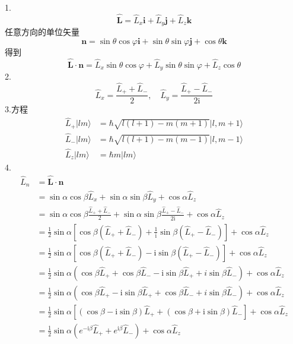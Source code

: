 1.
\begin{equation}
    \hat{\boldsymbol{L}}=\hat{L}_x\boldsymbol{i}+\hat{L}_y\boldsymbol{j}+\hat{L}_z\boldsymbol{k}
\end{equation}
任意方向的单位矢量
\begin{equation}
    \boldsymbol{n}=\sin \theta \cos \varphi \boldsymbol{i}+\sin \theta \sin \varphi \boldsymbol{j}+\cos \theta \boldsymbol{k}
\end{equation}
得到
\begin{equation}
    \hat{\boldsymbol{L}}\cdot \boldsymbol{n}=\hat{L}_x\sin \theta \cos \varphi +\hat{L}_y\sin \theta \sin \varphi +\hat{L}_z\cos \theta 
\end{equation}
2.
\begin{equation}
    \hat{L}_x=\frac{\hat{L}_++\hat{L}_-}{2},\quad \hat{L}_y=\frac{\hat{L}_+-\hat{L}_-}{2\mathrm{i}}
\end{equation}
3.方程
\begin{equation}
    \begin{aligned}
        \hat{L}_+|lm\rangle &=\hbar \sqrt{l\left( l+1 \right) -m\left( m+1 \right)}|l,m+1\rangle 
\\
\hat{L}_-|lm\rangle &=\hbar \sqrt{l\left( l+1 \right) -m\left( m-1 \right)}|l,m-1\rangle 
\\
\hat{L}_z|lm\rangle &=\hbar m|lm\rangle 
    \end{aligned}
\end{equation}
4.
\begin{equation}
    \begin{aligned}
        \hat{L}_n&=\hat{\boldsymbol{L}}\cdot \boldsymbol{n}
\\
&=\sin \alpha \cos \beta \hat{L}_x+\sin \alpha \sin \beta \hat{L}_y+\cos \alpha \hat{L}_z
\\
&=\sin \alpha \cos \beta \frac{\hat{L}_++\hat{L}_-}{2}+\sin \alpha \sin \beta \frac{\hat{L}_+-\hat{L}_-}{2\mathrm{i}}+\cos \alpha \hat{L}_z
\\
&=\frac{1}{2}\sin \alpha \left[ \cos \beta \left( \hat{L}_++\hat{L}_- \right) +\frac{1}{\mathrm{i}}\sin \beta \left( \hat{L}_+-\hat{L}_- \right) \right] +\cos \alpha \hat{L}_z
\\
&=\frac{1}{2}\sin \alpha \left[ \cos \beta \left( \hat{L}_++\hat{L}_- \right) -\mathrm{i}\sin \beta \left( \hat{L}_+-\hat{L}_- \right) \right] +\cos \alpha \hat{L}_z
\\
&=\frac{1}{2}\sin \alpha \left( \cos \beta \hat{L}_++\cos \beta \hat{L}_--\mathrm{i}\sin \beta \hat{L}_++i\sin \beta \hat{L}_- \right) +\cos \alpha \hat{L}_z
\\
&=\frac{1}{2}\sin \alpha \left( \cos \beta \hat{L}_+-\mathrm{i}\sin \beta \hat{L}_++\cos \beta \hat{L}_-+i\sin \beta \hat{L}_- \right) +\cos \alpha \hat{L}_z
\\
&=\frac{1}{2}\sin \alpha \left[ \left( \cos \beta -\mathrm{i}\sin \beta \right) \hat{L}_++\left( \cos \beta +\mathrm{i}\sin \beta \right) \hat{L}_- \right] +\cos \alpha \hat{L}_z
\\
&=\frac{1}{2}\sin \alpha \left( e^{-\mathrm{i}\beta}\hat{L}_++e^{\mathrm{i}\beta}\hat{L}_- \right) +\cos \alpha \hat{L}_z
    \end{aligned}
\end{equation}

